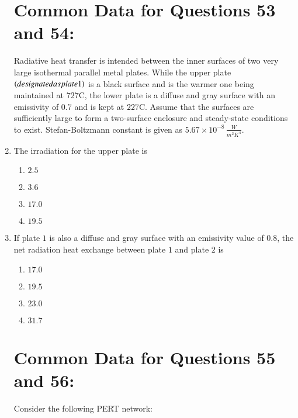 \documentclass[journal,12pt,twocolumn]{IEEEtran}
\theoremstyle{remark}
\begin{document}
\begin{enumerate}[start=49]
   \section{ Common Data for Questions 53 and 54:}
    
    Radiative heat transfer is intended between the inner surfaces of two very large isothermal parallel metal plates. While the upper plate $\left(designated as plate 1\right)$ is a black surface and is the warmer one being maintained at $727 $\degree C, the lower plate  is a diffuse and gray surface with an emissivity of $0.7$ and is kept at $227 $\degree C. Assume that the surfaces are sufficiently large to form a two-surface enclosure and steady-state conditions to exist. Stefan-Boltzmann constant is given as $5.67 \times 10^{-8} \, \frac{W}{{m}^2{K}^4}$.

\item The irradiation  for the upper plate  is


    \begin{enumerate}
        \item $2.5$
        \item $3.6$
        \item $17.0$
        \item $19.5$
    \end{enumerate}

    \item If plate $1$ is also a diffuse and gray surface with an emissivity value of $0.8$, the net radiation heat exchange  between plate $1$ and plate $2$ is
    \begin{enumerate}
        \item $17.0$
        \item $19.5$
        \item $23.0$
        \item $31.7$
    \end{enumerate} 

\section{ Common Data for Questions 55 and 56:}
    
    Consider the following PERT network:
    
   \begin{center}
\end{center}
\end{enumerate}
\end{document}
